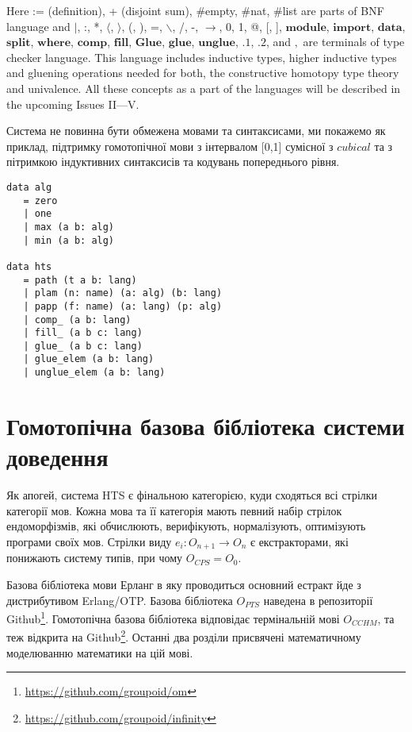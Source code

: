Here := (definition), + (disjoint sum), \#empty, \#nat, \#list are parts of BNF language and
$\rvert$, :, *, $\langle$, $\rangle$, (, ), =, $\backslash$, /, -, $\rightarrow$, 0, 1, @, [, ],
$\mathbf{module}$, $\mathbf{import}$,
$\mathbf{data}$, $\mathbf{split}$, $\mathbf{where}$, $\mathbf{comp}$, $\mathbf{fill}$,
$\mathbf{Glue}$, $\mathbf{glue}$, $\mathbf{unglue}$,
$\mathbf{.1}$, $\mathbf{.2}$,
 and $,$ are terminals of type checker language. This language includes
inductive types, higher inductive types and gluening operations needed for
both, the constructive homotopy type theory and univalence. All these concepts as a part of the languages
will be described in the upcoming Issues II---V.

Система не повинна бути обмежена мовами та синтаксисами, ми покажемо як приклад,
підтримку гомотопічної мови з інтервалом [0,1] сумісної з $cubical$ та з пітримкою індуктивних
синтаксисів та кодувань попереднього рівня.

\begin{lstlisting}[mathescape=true]
data alg
   = zero
   | one
   | max (a b: alg)
   | min (a b: alg)

data hts
   = path (t a b: lang)
   | plam (n: name) (a: alg) (b: lang)
   | papp (f: name) (a: lang) (p: alg)
   | comp_ (a b: lang)
   | fill_ (a b c: lang)
   | glue_ (a b c: lang)
   | glue_elem (a b: lang)
   | unglue_elem (a b: lang)
\end{lstlisting}

\section{Гомотопічна базова бібліотека системи доведення}

Як апогей, система HTS є фінальною категорією,
куди сходяться всі стрілки категорії мов. Кожна мова та її категорія
мають певний набір стрілок ендоморфізмів, які обчислюють, верифікують,
нормалізують, оптимізують програми своїх мов.
Стрілки виду $e_i: O_{n+1} \rightarrow O_n$ є екстракторами, які понижають систему типів,
при чому $O_{CPS} = O_0$.

Базова бібліотека мови Ерланг в яку проводиться основний
естракт йде з дистрибутивом Erlang/OTP. Базова бібліотека
$O_{PTS}$ наведена в репозиторії Github\footnote{\url{https://github.com/groupoid/om}}.
Гомотопічна базова бібліотека відповідає термінальній мові $O_{CCHM}$, та теж відкрита
на Github\footnote{\url{https://github.com/groupoid/infinity}}.
Останні два розділи присвячені математичному моделюванню математики на цій мові.

